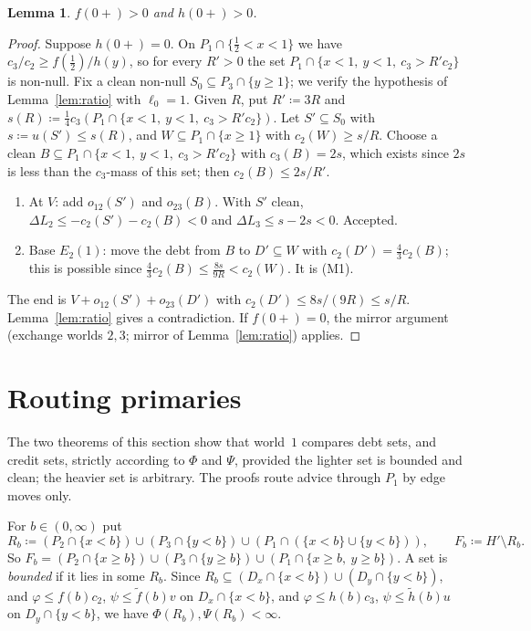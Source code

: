 \documentclass[11pt]{article}
\newtheorem{lemma}[theorem]{Lemma}
\theoremstyle{definition}\newtheorem{definition}[theorem]{Definition}
\theoremstyle{remark}\newtheorem{remark}[theorem]{Remark}
\newcommand{\ftil}{\tilde f}
\newcommand{\htil}{\tilde h}
\begin{document}
\begin{lemma}\label{lem:pos}
$f(0+)>0$ and $h(0+)>0$.
\end{lemma}
\begin{proof}
Suppose $h(0+)=0$. On
$P_1\cap\{\tfrac12<x<1\}$ we have $c_3/c_2\ge f(\tfrac12)/h(y)$, so for every
$R'>0$ the set $P_1\cap\{x<1,\ y<1,\ c_3>R'c_2\}$ is non-null. Fix a clean
non-null $S_0\subseteq P_3\cap\{y\ge1\}$; we verify the hypothesis of
Lemma~\ref{lem:ratio} with $\ell_0=1$. Given $R$, put $R'\coloneqq3R$ and
$s(R)\coloneqq\frac14c_3(P_1\cap\{x<1,\ y<1,\ c_3>R'c_2\})$. Let
$S'\subseteq S_0$ with $s\coloneqq u(S')\le s(R)$, and $W\subseteq
P_1\cap\{x\ge1\}$ with $c_2(W)\ge s/R$. Choose a clean $B\subseteq
P_1\cap\{x<1,\ y<1,\ c_3>R'c_2\}$ with $c_3(B)=2s$, which exists since
$2s$ is less than the $c_3$-mass of this set; then $c_2(B)\le2s/R'$.
\begin{enumerate}[label=\arabic*.,leftmargin=*,itemsep=1pt]
\item At $V$: add $o_{12}(S')$ and $o_{23}(B)$. With $S'$ clean, $\Delta
L_2\le-c_2(S')-c_2(B)<0$ and $\Delta L_3\le s-2s<0$. Accepted.
\item Base $E_2(1)$: move the debt from $B$ to $D'\subseteq W$ with
$c_2(D')=\frac43c_2(B)$; this is possible since $\frac43c_2(B)\le
\frac{8s}{9R}<c_2(W)$. It is (M1).
\end{enumerate}
The end is $V+o_{12}(S')+o_{23}(D')$ with $c_2(D')\le8s/(9R)\le s/R$.
Lemma~\ref{lem:ratio} gives a contradiction. If $f(0+)=0$, the mirror
argument (exchange worlds $2,3$; mirror of Lemma~\ref{lem:ratio}) applies.
\end{proof}

\section{Routing primaries}\label{sec:routing}

The two theorems of this section show that world~$1$ compares debt sets, and
credit sets, strictly according to $\Phi$ and $\Psi$, provided the
lighter set is bounded and clean; the heavier set is arbitrary. The proofs route advice through
$P_1$ by edge moves only.

For $b\in(0,\infty)$ put
\[
 R_b\coloneqq(P_2\cap\{x<b\})\cup(P_3\cap\{y<b\})\cup
 (P_1\cap(\{x<b\}\cup\{y<b\})),\qquad F_b\coloneqq H'\setminus R_b .
\]
So $F_b=(P_2\cap\{x\ge b\})\cup(P_3\cap\{y\ge b\})\cup(P_1\cap\{x\ge b,\
y\ge b\})$. A set is \emph{bounded} if it lies in some $R_b$. Since
$R_b\subseteq(D_x\cap\{x<b\})\cup(D_y\cap\{y<b\})$, and $\varphi\le f(b)c_2$,
$\psi\le\ftil(b)v$ on $D_x\cap\{x<b\}$, and $\varphi\le h(b)c_3$, $\psi\le
\htil(b)u$ on $D_y\cap\{y<b\}$, we have $\Phi(R_b),\Psi(R_b)<\infty$.
\end{document}
